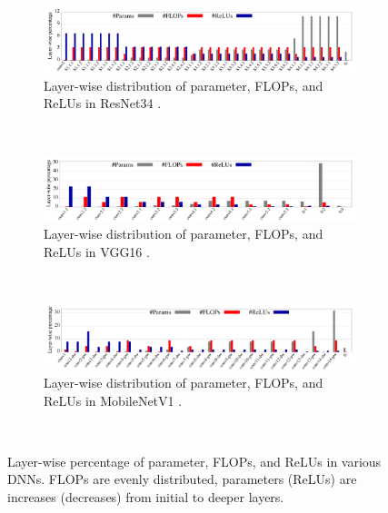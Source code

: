 
\begin{figure}
\begin{subfigure}{1.0\textwidth}
\includegraphics[scale=0.27]{Figures/LayerWiseOps_R34}
\caption{Layer-wise distribution of parameter, FLOPs, and ReLUs in ResNet34 \cite{he2016deep}.} \label{fig:LayerWiseReluInOtherDNNs_a}
\end{subfigure} \\
\begin{subfigure}{1.0\textwidth}
\includegraphics[scale=0.27]{Figures/LayerWiseOps_Vgg16}
\caption{Layer-wise distribution of parameter, FLOPs, and ReLUs in VGG16 \cite{simonyan2014very}.} \label{fig:LayerWiseReluInOtherDNNs_b}
\end{subfigure} \\
\begin{subfigure}{1.0\textwidth}
\includegraphics[scale=0.27]{Figures/LayerWiseOps_MV1}
\caption{Layer-wise distribution of parameter, FLOPs, and ReLUs in MobileNetV1 \cite{howard2017mobilenets}.} \label{fig:LayerWiseReluInOtherDNNs_c}
\end{subfigure} \\
\caption{Layer-wise percentage of parameter, FLOPs, and ReLUs in various DNNs. FLOPs are evenly distributed, parameters (ReLUs) are increases (decreases) from initial to deeper layers.} 
\label{fig:LayerWiseReluInOtherDNNs}
\end{figure}